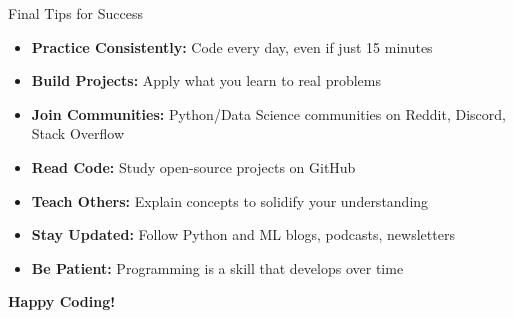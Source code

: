 \begin{frame}{Final Tips for Success}
    \begin{itemize}
        \item \textbf{Practice Consistently:} Code every day, even if just 15 minutes
        \item \textbf{Build Projects:} Apply what you learn to real problems
        \item \textbf{Join Communities:} Python/Data Science communities on Reddit, Discord, Stack Overflow
        \item \textbf{Read Code:} Study open-source projects on GitHub
        \item \textbf{Teach Others:} Explain concepts to solidify your understanding
        \item \textbf{Stay Updated:} Follow Python and ML blogs, podcasts, newsletters
        \item \textbf{Be Patient:} Programming is a skill that develops over time
    \end{itemize}
    
    \begin{center}
        \Large \textbf{Happy Coding! 🐍}
    \end{center}
\end{frame}
